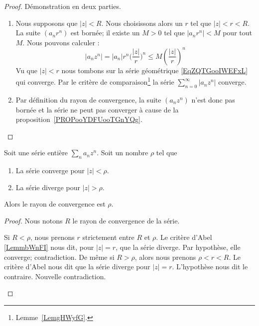\begin{proof}
	Démonstration en deux parties.
	\begin{enumerate}
		\item

		      Nous supposons que \( | z |<R\). Nous choisissons alors un \( r\) tel que \( | z |<r<R\). La suite \( (a_nr^n)\) est bornée; il existe un \( M>0\) tel que \( |a_nr^n|<M\) pour tout \( M\). Nous pouvons calculer :
		      \begin{equation}
			      | a_nz^n |=| a_n |r^n\big( \frac{ | z | }{ r } \big)^n\leq M\left( \frac{ | z | }{ r } \right)^n
		      \end{equation}
		      Vu que \( | z |<r\) nous tombons sur la série géométrique \eqref{EqZQTGooIWEFxL} qui converge. Par le critère de comparaison\footnote{Lemme~\ref{LemgHWyfG}.} la série \( \sum_{n=0}^{\infty}| a_nz^n |\) converge.

		\item
		      Par définition du rayon de convergence, la suite \( (a_nz^n)\) n'est donc pas bornée et la série ne peut pas converger à cause de la proposition~\ref{PROPooYDFUooTGnYQg}.
	\end{enumerate}
\end{proof}

\begin{corollary}       \label{CORooCUDSooTfMvAB}
	Soit une série entière \( \sum_na_nz^n\). Soit un nombre \( \rho\) tel que
	\begin{enumerate}
		\item
		      La série converge pour \( | z |<\rho\).
		\item
		      La série diverge pour \( | z |>\rho\).
	\end{enumerate}
	Alors le rayon de convergence est \( \rho\).
\end{corollary}

\begin{proof}
	Nous notons \( R\) le rayon de convergence de la série.
	\begin{subproof}
		Si \( R<\rho\), nous prenons \( r\) strictement entre \( R\) et \( \rho\). Le critère d'Abel \ref{LemmbWnFI} nous dit, pour \( | z |=r\), que la série diverge. Par hypothèse, elle converge; contradiction.
		De même si \( R>\rho\), alors nous prenons \( \rho<r<R\). Le critère d'Abel nous dit que la série diverge pour \( | z |=r\). L'hypothèse nous dit le contraire. Nouvelle contradiction.
	\end{subproof}
\end{proof}

